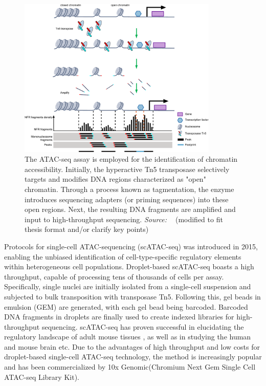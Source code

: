 \begin{figure}[!ht]
	\centering
	\includegraphics[width=0.85\textwidth]{scATAC-seq/fig}
	\vspace{0.1cm}
	\caption[ATAC sequenceing schematic flow.]{The ATAC-seq assay is employed for the identification of chromatin accessibility. Initially, the hyperactive Tn5 transposase selectively targets and modifies DNA regions characterized as "open" chromatin. Through a process known as tagmentation, the enzyme introduces sequencing adapters (or priming sequences) into these open regions. Next, the resulting DNA fragments are amplified and input to high-throughput sequencing. \emph{Source: ~\cite{yan2020reads}} (modified to fit thesis format and/or clarify key points)}
	\label{fig:ATAC-seq}
\end{figure}

Protocols for single-cell ATAC-sequencing (scATAC-seq) was introduced in 2015\citep{Buenrostro2015,cusanovich2015multiplex}, enabling the unbiased identification of cell-type-specific regulatory elements within heterogeneous cell populations. Droplet-based scATAC-seq boasts a high throughput, capable of processing tens of thousands of cells per assay. Specifically, single nuclei are initially isolated from a single-cell suspension and subjected to bulk transposition with transposase Tn5. Following this, gel beads in emulsion (GEM) are generated, with each gel bead being barcoded. Barcoded DNA fragments in droplets are finally used to create indexed libraries for high-throughput sequencing. scATAC-seq has proven successful in elucidating the regulatory landscape of adult mouse tissues \citep{cusanovich2018single}, as well as in studying the human and mouse brain \cite{lake2018humanbrain, sinnamon2019accessible} etc. Due to the advantages of high throughput and low costs for droplet-based single-cell ATAC-seq technology, the method is increasingly popular and has been commercialized by 10x Genomic(Chromium Next Gem Single Cell ATAC-seq Library Kit)\cite{satpathy2019massively}.



